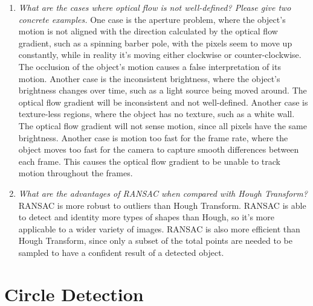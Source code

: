 \documentclass[11pt]{article}
\begin{document}
\begin{enumerate}
        \item \textit{What are the cases where optical flow is not well-defined? Please give two concrete examples.}\newline
        One case is the aperture problem, where the object's motion is not aligned with the direction calculated by the
        optical flow gradient, such as a spinning barber pole, with the pixels seem to move up constantly, while in
        reality it's moving either clockwise or counter-clockwise. The occlusion of the object's motion causes a false
        interpretation of its motion.\newline
        Another case is the inconsistent brightness, where the object's brightness changes over time, such as a
        light source being moved around. The optical flow gradient will be inconsistent and not well-defined.\newline
        Another case is texture-less regions, where the object has no texture, such as a white wall. The optical flow
        gradient will not sense motion, since all pixels have the same brightness.\newline
        Another case is motion too fast for the frame rate, where the object moves too fast for the camera to capture
        smooth differences between each frame. This causes the optical flow gradient to be unable to track motion
        throughout the frames.\newline

        \item \textit{What are the advantages of RANSAC when compared with Hough Transform?}\newline
        RANSAC is more robust to outliers than Hough Transform. RANSAC is able to detect and identity more types of
        shapes than Hough, so it's more applicable to a wider variety of images. RANSAC is also more efficient than
        Hough Transform, since only a subset of the total points are needed to be sampled to have a confident result
        of a detected object.\newline

    \end{enumerate}


    \section{Circle Detection}
\end{document}
